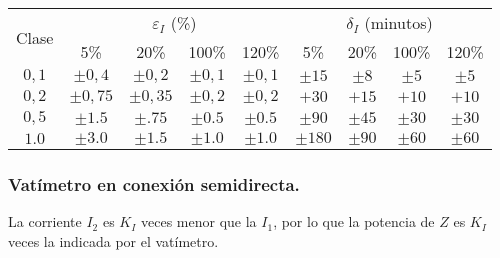 				\begin{table}[H]
					\centering
					\begin{tabular}{|c|c|c|c|c||c|c|c|c|}
						\hline
						\multirow{2}{*}{Clase} & \multicolumn{4}{c||}{$\varepsilon_I$ (\%)} & \multicolumn{4}{c|}{$\delta_I$ (minutos)} \\
						\cline{2-9}
						& 5\% & 20\% & 100\% & 120\% & 5\% & 20\% & 100\% & 120\% \\
						\hline
						$0,1$ &$\pm0,4$ &$\pm0,2$ &$\pm0,1$ &$\pm0,1$ &$\pm15$ &$\pm8$ &$\pm5$ &$\pm5$ \\
						$0,2$ &$\pm0,75$& $\pm0,35$& $\pm0,2$& $\pm0,2$& $+30$ & $+15$ & $+10$ & $+10$ \\ 
						$0,5$ & $\pm1.5$ & $\pm.75$ & $\pm0.5$ & $\pm0.5$ & $\pm90$ & $\pm45$ & $\pm30$ & $\pm30$ \\ 
						$1.0$ & $\pm3.0$ & $\pm1.5$ & $\pm1.0$ & $\pm1.0$ & $\pm180$ & $\pm90$ & $\pm60$ & $\pm60$ \\
						\hline
					\end{tabular}
				\end{table}
				
			\subsubsection*{Vatímetro en conexión semidirecta.}
				La corriente $I_2$ es $K_I$ veces menor que la $I_1$, por lo que la
				potencia de $Z$ es $K_I$ veces la indicada por el vatímetro.
			
